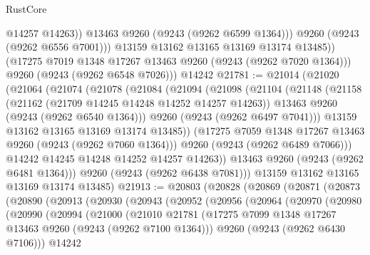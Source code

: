 \begin{lexlean}{RustCore}
\begin{coremodule}
                  @14257
                  @14263))
              @13463
              @9260
              (@9243 (@9262 @6599 @1364)))
            @9260
            (@9243 (@9262 @6556 @7001)))
          @13159
          @13162
          @13165
          @13169
          @13174
          @13485))
      (@17275 @7019 @1348 @17267 @13463 @9260 (@9243 (@9262 @7020 @1364)))
      @9260
      (@9243 (@9262 @6548 @7026)))
    @14242
@21781 := @21014
    (@21020
      (@21064
        (@21074
          (@21078
            (@21084
              (@21094
                (@21098
                  (@21104
                    (@21148
                      (@21158
                        (@21162 (@21709 @14245 @14248 @14252 @14257 @14263))
                        @13463
                        @9260
                        (@9243 (@9262 @6540 @1364)))
                      @9260
                      (@9243 (@9262 @6497 @7041)))
                    @13159
                    @13162
                    @13165
                    @13169
                    @13174
                    @13485))
                (@17275 @7059 @1348 @17267 @13463 @9260 (@9243 (@9262 @7060 @1364)))
                @9260
                (@9243 (@9262 @6489 @7066)))
              @14242
              @14245
              @14248
              @14252
              @14257
              @14263))
          @13463
          @9260
          (@9243 (@9262 @6481 @1364)))
        @9260
        (@9243 (@9262 @6438 @7081)))
      @13159
      @13162
      @13165
      @13169
      @13174
      @13485)
@21913 := @20803
    (@20828
      (@20869
        (@20871
          (@20873
            (@20890
              (@20913
                (@20930
                  (@20943
                    (@20952
                      (@20956
                        (@20964
                          (@20970
                            (@20980
                              (@20990
                                (@20994
                                  (@21000
                                    (@21010
                                      @21781
                                      (@17275
                                        @7099
                                        @1348
                                        @17267
                                        @13463
                                        @9260
                                        (@9243 (@9262 @7100 @1364)))
                                      @9260
                                      (@9243 (@9262 @6430 @7106)))
                                    @14242

\end{coremodule}
\end{lexlean}
